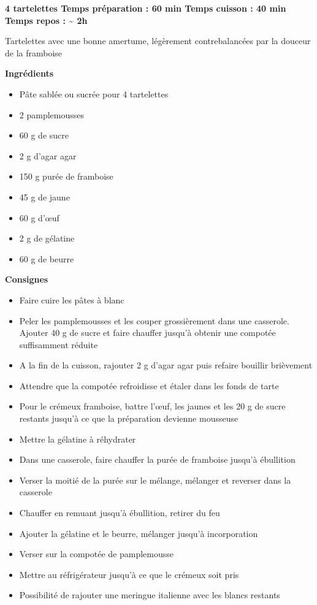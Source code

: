 \documentclass[]{book}
\providecommand{\tightlist}{%
  \setlength{\itemsep}{0pt}\setlength{\parskip}{0pt}}
\begin{document}
\begin{sucrebox}
\textbf{4 tartelettes \textbar{} Temps préparation : 60 min \textbar{}
Temps cuisson : 40 min \textbar{} Temps repos : \textasciitilde{} 2h}

Tartelettes avec une bonne amertume, légèrement contrebalancées par la
douceur de la framboise
\end{sucrebox}

\textbf{Ingrédients}

\begin{itemize}
\tightlist
\item
  Pâte sablée ou sucrée pour 4 tartelettes
\item
  2 pamplemousses
\item
  60 g de sucre
\item
  2 g d'agar agar
\item
  150 g purée de framboise
\item
  45 g de jaune
\item
  60 g d'œuf
\item
  2 g de gélatine
\item
  60 g de beurre
\end{itemize}

\textbf{Consignes}

\begin{itemize}
\tightlist
\item
  Faire cuire les pâtes à blanc
\item
  Peler les pamplemousses et les couper grossièrement dans une casserole. Ajouter 40 g de sucre et faire chauffer jusqu'à obtenir une compotée suffisamment réduite
\item
  A la fin de la cuisson, rajouter 2 g d'agar agar puis refaire bouillir brièvement
\item
  Attendre que la compotée refroidisse et étaler dans les fonds de tarte
\item
  Pour le crémeux framboise, battre l'œuf, les jaunes et les 20 g de sucre restants jusqu'à ce que la préparation devienne mousseuse
\item
  Mettre la gélatine à réhydrater
\item
  Dans une casserole, faire chauffer la purée de framboise jusqu'à ébullition
\item
  Verser la moitié de la purée sur le mélange, mélanger et reverser dans la casserole
\item
  Chauffer en remuant jusqu'à ébullition, retirer du feu
\item
  Ajouter la gélatine et le beurre, mélanger jusqu'à incorporation
\item
  Verser sur la compotée de pamplemousse
\item
  Mettre au réfrigérateur jusqu'à ce que le crémeux soit pris
\item
  Possibilité de rajouter une meringue italienne avec les blancs restants
\end{itemize}
\end{document}
